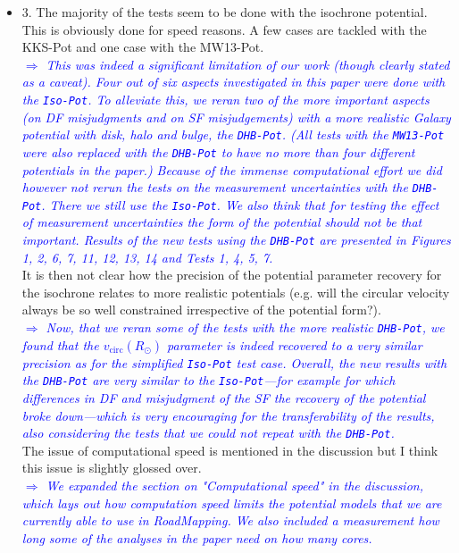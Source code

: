 \documentclass[10pt,a4paper]{article}
\newcommand{\Comment}[1]{\textsl{\textcolor{Blue}{$\Longrightarrow$ {#1}}}}
\newcommand{\RM}{{\sl RoadMapping}}
\begin{document}
\begin{itemize}
\item 3. The majority of the tests seem to be done with the isochrone potential. This is obviously done for speed reasons. A few cases are tackled with the KKS-Pot and one case with the MW13-Pot. \\\Comment{This was indeed a significant limitation of our work (though clearly stated as a caveat). Four out of six aspects investigated in this paper were done with the \texttt{Iso-Pot}. To alleviate this, we reran two of the more important aspects (on DF misjudgments and on SF misjudgements) with a more realistic Galaxy potential with disk, halo and bulge, the \texttt{DHB-Pot}. (All tests with the \texttt{MW13-Pot} were also replaced with the \texttt{DHB-Pot} to have no more than four different potentials in the paper.) Because of the immense computational effort we did however not rerun the tests on the measurement uncertainties with the \texttt{DHB-Pot}. There we still use the \texttt{Iso-Pot}. We also think that for testing the effect of measurement uncertainties the form of the potential should not be that important. Results of the new tests using the \texttt{DHB-Pot} are presented in Figures 1, 2, 6, 7, 11, 12, 13, 14 and Tests 1, 4, 5, 7.} \\
It is then not clear how the precision of the potential parameter recovery for the isochrone relates to more realistic potentials (e.g. will the circular velocity always be so well constrained irrespective of the potential form?). \\\Comment{Now, that we reran some of the tests with the more realistic \texttt{DHB-Pot}, we found that the $v_\text{circ}(R_\odot)$ parameter is indeed recovered to a very similar precision as for the simplified \texttt{Iso-Pot} test case. Overall, the new results with the \texttt{DHB-Pot} are very similar to the \texttt{Iso-Pot}---for example for which differences in DF and misjudgment of the SF the recovery of the potential broke down---which is very encouraging for the transferability of the results, also considering the tests that we could not repeat with the \texttt{DHB-Pot}.}\\
The issue of computational speed is mentioned in the discussion but I think this issue is slightly glossed over. \\\Comment{We expanded the section on "Computational speed" in the discussion, which lays out how computation speed limits the potential models that we are currently able to use in \RM{}. We also included a measurement how long some of the analyses in the paper need on how many cores.}\\

\end{itemize}
\end{document}
